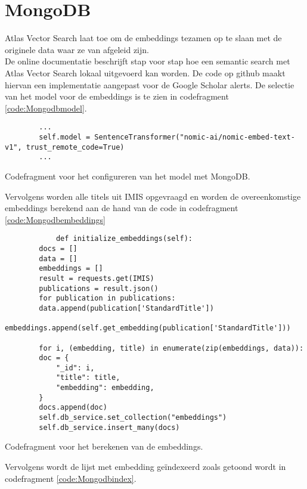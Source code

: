 \section{MongoDB}
Atlas Vector Search \autocite{Mongodbvectorsearch2025} laat toe om de embeddings tezamen op te slaan met de originele data waar ze van afgeleid zijn.\\
De online documentatie \textcite{Usemongodbvectorsearch2025} beschrijft stap voor stap hoe een semantic search met Atlas Vector Search lokaal uitgevoerd kan worden. 
De code op github \textcite{Depaepemongodb2025} maakt hiervan een implementatie aangepast voor de Google Scholar alerts.
De selectie van het model voor de embeddings is te zien in codefragment \ref{code:Mongodbmodel}.
\begin{listing}
    \begin{verbatim}
        ...
        self.model = SentenceTransformer("nomic-ai/nomic-embed-text-v1", trust_remote_code=True)
        ...
    \end{verbatim}
    \caption[MongoDB model codefragment]{Codefragment voor het configureren van het model met MongoDB.}
    \label{code:Mongodbmodel}
\end{listing}
Vervolgens worden alle titels uit IMIS opgevraagd en worden de overeenkomstige embeddings berekend aan de hand van de code in codefragment \ref{code:Mongodbembeddings}
\begin{listing}
    \begin{verbatim}
            def initialize_embeddings(self):
        docs = []
        data = []
        embeddings = []
        result = requests.get(IMIS)
        publications = result.json()
        for publication in publications:
        data.append(publication['StandardTitle'])
        embeddings.append(self.get_embedding(publication['StandardTitle']))
        
        for i, (embedding, title) in enumerate(zip(embeddings, data)):
        doc = {
            "_id": i,
            "title": title,
            "embedding": embedding,
        }
        docs.append(doc)
        self.db_service.set_collection("embeddings")
        self.db_service.insert_many(docs)
    \end{verbatim}
    \caption[Embeddings codefragment]{Codefragment voor het berekenen van de embeddings.}
    \label{code:Mongodbembeddings}
\end{listing}
Vervolgens wordt de lijst met embedding geïndexeerd zoals getoond wordt in codefragment \ref{code:Mongodbindex}.
